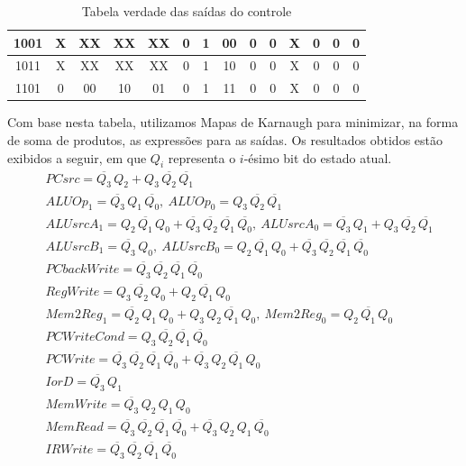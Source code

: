 \documentclass[a4paper,12pt]{article}
\begin{document}
\begin{table}[H]
{\begin{tabular}{|c|c|c|c|c|c|c|c|c|c|c|c|c|c|}
        1001 & X & XX & XX & XX & 0 & 1 & 00 & 0 & 0 & X & 0 & 0 & 0 \\ \hline

        \rowcolor{gray!20}
        1011 & X & XX & XX & XX & 0 & 1 & 10 & 0 & 0 & X & 0 & 0 & 0 \\ \hline

        1101 & 0 & 00 & 10 & 01 & 0 & 1 & 11 & 0 & 0 & X & 0 & 0 & 0 \\ \hline
    \end{tabular}
    }
    \caption{Tabela verdade das saídas do controle}
    \label{tab:saidas}
\end{table}

Com base nesta tabela, utilizamos Mapas de Karnaugh para minimizar, na forma de soma de produtos, as expressões para as saídas. Os resultados obtidos estão exibidos a seguir, em que $Q_i$ representa o $i$-ésimo bit do estado atual.
{\small
\begin{align*}
    &PCsrc =
        \overline{Q_3}\,Q_2
        +
        Q_3\,\overline{Q_2}\,\overline{Q_1}\\
    &ALUOp_1 =
        \overline{Q_3}\,Q_1\,\overline{Q_0}, \
    ALUOp_0 =
        Q_3\,\overline{Q_2}\,\overline{Q_1}\\
    &ALUsrcA_1 =
        Q_2\,\overline{Q_1}\,Q_0
        +
        \overline{Q_3}\,\overline{Q_2}\,\overline{Q_1}\,\overline{Q_0}, \
    ALUsrcA_0 =
        \overline{Q_3}\,Q_1
        +
        Q_3\,\overline{Q_2}\,\overline{Q_1}\\
    &ALUsrcB_1 =
        \overline{Q_3}\,Q_0, \
    ALUsrcB_0 =
        Q_2\,\overline{Q_1}\,Q_0
        +
        \overline{Q_3}\,\overline{Q_2}\,\overline{Q_1}\,\overline{Q_0}\\
    &PCbackWrite =
        \overline{Q_3}\,\overline{Q_2}\,\overline{Q_1}\,\overline{Q_0}\\
    &RegWrite =
        Q_3\,\overline{Q_2}\,Q_0
        +
        Q_2\,\overline{Q_1}\,Q_0\\
    &Mem2Reg_1 =
        \overline{Q_2}\,Q_1\,Q_0
        +
        Q_3\,Q_2\,\overline{Q_1}\,Q_0, \
    Mem2Reg_0 =
        Q_2\,\overline{Q_1}\,Q_0\\
    &PCWriteCond = 
    Q_3\,\overline{Q_2}\,\overline{Q_1}\,\overline{Q_0}\\
    &PCWrite =
        \overline{Q_3}\,\overline{Q_2}\,\overline{Q_1}\,\overline{Q_0}
        +
        \overline{Q_3}\,Q_2\,\overline{Q_1}\,Q_0 \\
    &IorD =
        \overline{Q_3}\,Q_1\\
    &MemWrite =
        \overline{Q_3}\,Q_2\,Q_1\,Q_0\\
    &MemRead =
        \overline{Q_3}\,\overline{Q_2}\,\overline{Q_1}\,\overline{Q_0}
        +
        \overline{Q_3}\,Q_2\,Q_1\,\overline{Q_0}\\
    &IRWrite =
        \overline{Q_3}\,\overline{Q_2}\,\overline{Q_1}\,\overline{Q_0}
\end{align*}
}
\end{document}

